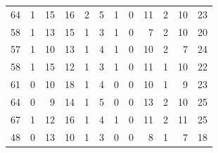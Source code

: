 \begin{table}[]
\begin{tabular}{rrrrrrrrrrrr}
		64 & 1 & 15 & 16 & 2 & 5 & 1 & 0 & 11 & 2 & 10 & 23 \\
		58 & 1 & 13 & 15 & 1 & 3 & 1 & 0 & 7 & 2 & 10 & 20 \\
		57 & 1 & 10 & 13 & 1 & 4 & 1 & 0 & 10 & 2 & 7 & 24 \\
		58 & 1 & 15 & 12 & 1 & 3 & 1 & 0 & 11 & 1 & 10 & 22 \\
		61 & 0 & 10 & 18 & 1 & 4 & 0 & 0 & 10 & 1 & 9 & 23 \\
		64 & 0 & 9 & 14 & 1 & 5 & 0 & 0 & 13 & 2 & 10 & 25 \\
		67 & 1 & 12 & 16 & 1 & 4 & 1 & 0 & 11 & 2 & 11 & 25 \\
		48 & 0 & 13 & 10 & 1 & 3 & 0 & 0 & 8 & 1 & 7 & 18
	\end{tabular}
\end{table}

